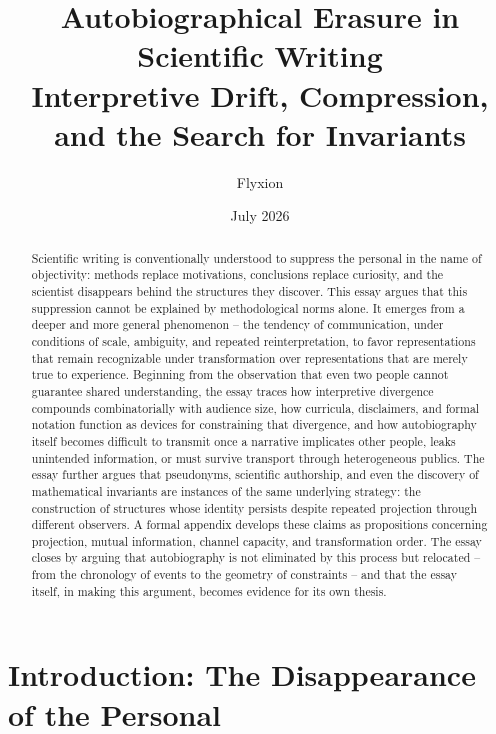 \documentclass[11pt]{article}
\title{\Large\textbf{Autobiographical Erasure in Scientific Writing}\\[0.3em]
\large Interpretive Drift, Compression, and the Search for Invariants}
\author{Flyxion}
\date{July 2026}
\theoremstyle{plain}
\begin{document}
\maketitle

\begin{abstract}
\noindent Scientific writing is conventionally understood to suppress the personal in the name of objectivity: methods replace motivations, conclusions replace curiosity, and the scientist disappears behind the structures they discover. This essay argues that this suppression cannot be explained by methodological norms alone. It emerges from a deeper and more general phenomenon -- the tendency of communication, under conditions of scale, ambiguity, and repeated reinterpretation, to favor representations that remain recognizable under transformation over representations that are merely true to experience. Beginning from the observation that even two people cannot guarantee shared understanding, the essay traces how interpretive divergence compounds combinatorially with audience size, how curricula, disclaimers, and formal notation function as devices for constraining that divergence, and how autobiography itself becomes difficult to transmit once a narrative implicates other people, leaks unintended information, or must survive transport through heterogeneous publics. The essay further argues that pseudonyms, scientific authorship, and even the discovery of mathematical invariants are instances of the same underlying strategy: the construction of structures whose identity persists despite repeated projection through different observers. A formal appendix develops these claims as propositions concerning projection, mutual information, channel capacity, and transformation order. The essay closes by arguing that autobiography is not eliminated by this process but relocated -- from the chronology of events to the geometry of constraints -- and that the essay itself, in making this argument, becomes evidence for its own thesis.
\end{abstract}

\newpage

\tableofcontents

\newpage

\section{Introduction: The Disappearance of the Personal}
\end{document}
